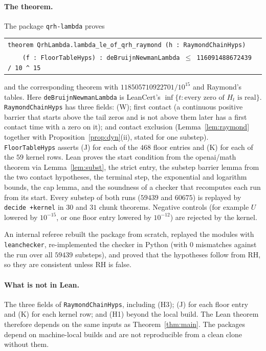 \documentclass[11pt]{article}
\theoremstyle{definition}
\begin{document}
\paragraph{The theorem.} The package \texttt{qrh-lambda} proves
\begin{center}
\small
\begin{tabular}{@{}l@{}}
\texttt{theorem QrhLambda.lambda\_le\_of\_qrh\_raymond (h : RaymondChainHyps)}\\
\texttt{\ \ \ \ (f : FloorTableHyps) : deBruijnNewmanLambda $\le$ 116091488672439 / 10 \^{} 15}
\end{tabular}
\end{center}
and the corresponding theorem with $118505710922701/10^{15}$ and Raymond's tables. Here
\texttt{deBruijnNewmanLambda} is LeanCert's
$\inf\{t:\text{every zero of }H_t\text{ is real}\}$. \texttt{RaymondChainHyps} has three
fields: (W); first contact (a continuous positive barrier that starts above the tail zeros
and is not above them later has a first contact time with a zero on it); and contact
exclusion (Lemma~\ref{lem:raymond} together with Proposition~\ref{prop:dyn}(ii), stated for
one substep). \texttt{FloorTableHyps} asserts (J) for each of the $468$ floor entries and (K)
for each of the $59$ kernel rows. Lean proves the start condition from the openai/math
theorem via Lemma~\ref{lem:subst}, the strict entry, the substep barrier lemma from the two
contact hypotheses, the terminal step, the exponential and logarithm bounds, the cap lemma,
and the soundness of a checker that recomputes each run from its start. Every substep of
both runs ($59439$ and $60675$) is replayed by \texttt{decide +kernel} in $30$ and $31$ chunk
theorems. Negative controls (for example $U$ lowered by $10^{-15}$, or one floor entry
lowered by $10^{-12}$) are rejected by the kernel.

An internal referee rebuilt the package from scratch, replayed the modules with
\texttt{leanchecker}, re-implemented the checker in Python (with $0$ mismatches against the
run over all $59439$ substeps), and proved that the hypotheses follow from RH, so they are
consistent unless RH is false.

\paragraph{What is not in Lean.} The three fields of \texttt{RaymondChainHyps}, including
(H3); (J) for each floor entry and (K) for each kernel row; and (H1) beyond the local build.
The Lean theorem therefore depends on the same inputs as Theorem~\ref{thm:main}. The
packages depend on machine-local builds and are not reproducible from a clean clone without
them.
\end{document}
